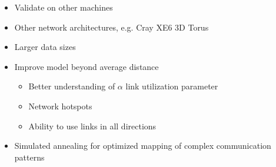 \documentclass{acm_proc_article-sp}
\begin{document}
\begin{itemize}
\item Validate on other machines

\item Other network architectures, e.g. Cray XE6 3D Torus
\item Larger data sizes
\item Improve model beyond average distance
  \begin{itemize}
    \item Better understanding of $\alpha$ link utilization parameter
    \item Network hotspots
    \item Ability to use links in all directions
  \end{itemize}
\item Simulated annealing for optimized mapping of complex communication patterns
\end{itemize}





\end{document}
